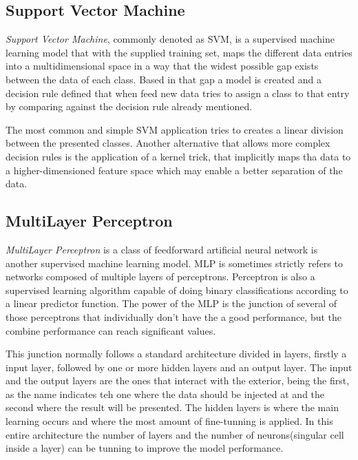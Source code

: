 \documentclass[extendedabs]{recpad2k}
\begin{document}
\subsection{Support Vector Machine}
\textit{Support Vector Machine}, commonly denoted as SVM, is a supervised machine learning model that with the supplied training set, maps the different data 
entries into a multidimensional space in a way that the widest possible gap exists between the data of each class. Based in that gap a model is created and a 
decision rule defined that when feed new data tries to assign a class to that entry by comparing against the decision rule already mentioned.

The most common and simple SVM application tries to creates a linear division between the presented classes. Another alternative that allows more complex 
decision rules is the application of a kernel trick, that implicitly maps tha data to a higher-dimensioned feature space which may enable a better separation 
of the data.

\subsection{MultiLayer Perceptron}
\textit{MultiLayer Perceptron} is a class of feedforward artificial neural network is another supervised machine learning model. MLP is sometimes strictly 
refers to networks composed of multiple layers of perceptrons. Perceptron is also a supervised learning algorithm capable of doing binary classifications 
according to a linear predictor function. The power of the MLP is the junction of several of those perceptrons that individually don't have the a good 
performance, but the combine performance can reach significant values.

This junction normally follows a standard architecture divided in layers, firstly a input layer, followed by one or more hidden layers and an output layer. 
The input and the output layers are the ones that interact with the exterior, being the first, as the name indicates teh one where the data should be injected 
at and the second where the result will be presented. The hidden layers is where the main learning occurs and where the most amount of fine-tunning is applied. 
In this entire architecture the number of layers and the number of neurons(singular cell inside a layer) can be tunning to improve the model performance.
\end{document}

